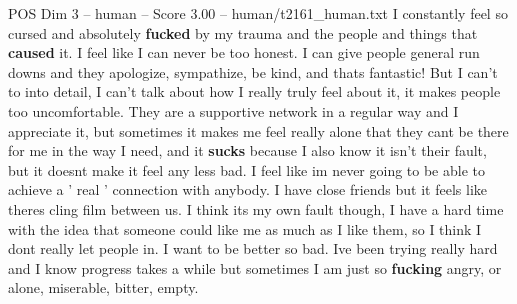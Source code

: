 \begin{textsample}{POS Dim 3 – human – Score 3.00 – human/t2161\_human.txt}  \label{ex:f3_pos_014}
I constantly feel so cursed and absolutely \textbf{fucked} by my trauma and the people and things that \textbf{caused} it.
I feel like I can never be too honest.
I can give people general run downs and they apologize, sympathize, be kind, and thats fantastic!
But I can't to into detail, I can't talk about how I really truly feel about it, it makes people too uncomfortable.
They are a supportive network in a regular way and I appreciate it, but sometimes it makes me feel really alone that they cant be there for me in the way I need, and it \textbf{sucks} because I also know it isn't their fault, but it doesnt make it feel any less bad.
I feel like im never going to be able to achieve a ' real ' connection with anybody.
I have close friends but it feels like theres cling film between us.
I think its my own fault though, I have a hard time with the idea that someone could like me as much as I like them, so I think I dont really let people in.
I want to be better so bad.
Ive been trying really hard and I know progress takes a while but sometimes I am just so \textbf{fucking} angry, or alone, miserable, bitter, empty.

\end{textsample}
